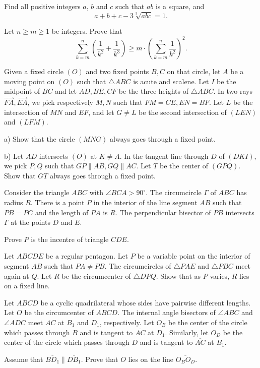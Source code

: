 \documentclass[11pt]{scrartcl}
\begin{document}
\begin{problem}[5961161574215019498]
	Find all positive integers $a$, $b$ and $c$ such that $ab$ is a square, and
\[a+b+c-3\sqrt[3]{abc}=1.\]
\end{problem}
\begin{problem}[5968448186928885521]
Let $n\ge m\ge 1$ be integers. Prove that
\[\sum_{k=m}^n \left (\frac 1{k^2}+\frac 1{k^3}\right) \ge m\cdot \left(\sum_{k=m}^n \frac 1{k^2}\right)^2.\]
\end{problem}
\begin{problem}[5990443173263547430]
	Given a fixed circle $(O)$ and two fixed points $B, C$ on that circle, let $A$ be a moving point on $(O)$ such that $\triangle ABC$ is acute and scalene. Let $I$ be the midpoint of $BC$ and let $AD, BE, CF$ be the three heights of $\triangle ABC$. In two rays $\overrightarrow{FA}, \overrightarrow{EA}$, we pick respectively $M,N$ such that $FM = CE, EN = BF$. Let $L$ be the intersection of $MN$ and $EF$, and let $G \neq L$ be the second intersection of $(LEN)$ and $(LFM)$.

a) Show that the circle $(MNG)$ always goes through a fixed point.

b) Let $AD$ intersects $(O)$ at $K \neq A$. In the tangent line through $D$ of $(DKI)$, we pick $P,Q$ such that $GP \parallel AB, GQ \parallel AC$. Let $T$ be the center of $(GPQ)$. Show that $GT$ always goes through a fixed point.
\end{problem}
\begin{problem}[6002187361907355959]
	Consider the triangle $ABC$ with $\angle BCA > 90^{\circ}$. The circumcircle $\Gamma$ of $ABC$ has radius $R$. There is a point $P$ in the interior of the line segment $AB$ such that $PB = PC$ and the length of $PA$ is $R$. The perpendicular bisector of $PB$ intersects $\Gamma$ at the points $D$ and $E$.

Prove $P$ is the incentre of triangle $CDE$.
\end{problem}
\begin{problem}[6020628633767269011]
Let \(ABCDE\) be a regular pentagon. Let \(P\) be a variable point on the interior of segment \(AB\) such that \(PA\ne PB\). The circumcircles of \(\triangle PAE\) and \(\triangle PBC\) meet again at \(Q\). Let \(R\) be the circumcenter of \(\triangle DPQ\). Show that as \(P\) varies, \(R\) lies on a fixed line.
\end{problem}
\begin{problem}[6025085618534905645]
	Let $ABCD$ be a cyclic quadrilateral whose sides have pairwise different lengths. Let $O$ be the circumcenter of $ABCD$. The internal angle bisectors of $\angle ABC$ and $\angle ADC$ meet $AC$ at $B_1$ and $D_1$, respectively. Let $O_B$ be the center of the circle which passes through $B$ and is tangent to $\overline{AC}$ at $D_1$. Similarly, let $O_D$ be the center of the circle which passes through $D$ and is tangent to $\overline{AC}$ at $B_1$.

Assume that $\overline{BD_1} \parallel \overline{DB_1}$. Prove that $O$ lies on the line $\overline{O_BO_D}$.
\end{problem}
\end{document}
